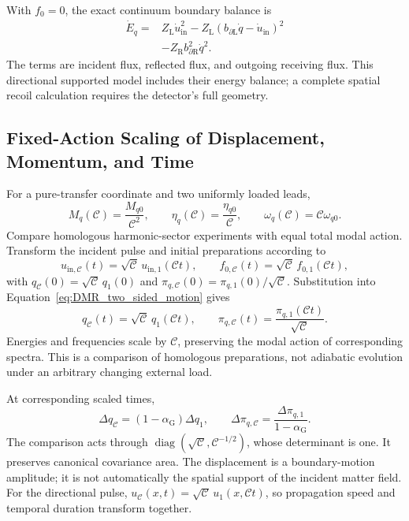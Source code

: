With $f_0=0$, the exact continuum boundary balance is
\begin{equation}
\begin{aligned}
 \dot E_q={}&Z_{\mathrm L}\dot u_{\mathrm{in}}^2
 -Z_{\mathrm L}(b_{\partial\mathrm L}\dot q-\dot u_{\mathrm{in}})^2\\
 &-Z_{\mathrm R}b_{\partial\mathrm R}^2\dot q^2.
\end{aligned}
\label{eq:DMR_boundary_flux_balance}
\end{equation}
The terms are incident flux, reflected flux, and outgoing receiving flux. This directional supported model includes their energy balance; a complete spatial recoil calculation requires the detector's full geometry.

\subsection{Fixed-Action Scaling of Displacement, Momentum, and Time}

For a pure-transfer coordinate and two uniformly loaded leads,
\begin{equation}
 M_q(\mathcal C)=\frac{M_{q0}}{\mathcal C^2},
 \qquad \eta_q(\mathcal C)=\frac{\eta_{q0}}{\mathcal C},
 \qquad \omega_q(\mathcal C)=\mathcal C\omega_{q0}.
\label{eq:DMR_uniform_parameters}
\end{equation}
Compare homologous harmonic-sector experiments with equal total modal action. Transform the incident pulse and initial preparations according to
\begin{equation}
 u_{\mathrm{in},\mathcal C}(t)=\sqrt{\mathcal C}\,u_{\mathrm{in},1}(\mathcal C t),
 \qquad f_{0,\mathcal C}(t)=\sqrt{\mathcal C}\,f_{0,1}(\mathcal C t),
\end{equation}
with $q_{\mathcal C}(0)=\sqrt{\mathcal C}\,q_1(0)$ and $\pi_{q,\mathcal C}(0)=\pi_{q,1}(0)/\sqrt{\mathcal C}$. Substitution into Equation~\eqref{eq:DMR_two_sided_motion} gives
\begin{equation}
 \boxed{
 q_{\mathcal C}(t)=\sqrt{\mathcal C}\,q_1(\mathcal C t),
 \qquad \pi_{q,\mathcal C}(t)=\frac{\pi_{q,1}(\mathcal C t)}{\sqrt{\mathcal C}}
 }.
\label{eq:DMR_action_scaling}
\end{equation}
Energies and frequencies scale by $\mathcal C$, preserving the modal action of corresponding spectra. This is a comparison of homologous preparations, not adiabatic evolution under an arbitrary changing external load.

At corresponding scaled times,
\begin{equation}
 \boxed{
 \Delta q_{\mathcal C}=(1-\alpha_{\mathrm G})\Delta q_1,
 \qquad
 \Delta \pi_{q,\mathcal C}=\frac{\Delta \pi_{q,1}}{1-\alpha_{\mathrm G}}
 }.
\label{eq:DMR_reciprocal_spreads}
\end{equation}
The comparison acts through $\operatorname{diag}(\sqrt{\mathcal C},\mathcal C^{-1/2})$, whose determinant is one. It preserves canonical covariance area. The displacement is a boundary-motion amplitude; it is not automatically the spatial support of the incident matter field. For the directional pulse, $u_{\mathcal C}(x,t)=\sqrt{\mathcal C}\,u_1(x,\mathcal C t)$, so propagation speed and temporal duration transform together.

